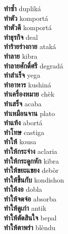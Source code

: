 \textbf{ ทำซ้ำ  } dupliká \\
\textbf{ ทำตัว  } komportá \\
\textbf{ ทำตัวดี  } komportá \\
\textbf{ ทำธุรกิจ  } deal \\
\textbf{ ทำร้ายร่างกาย  } ataká \\
\textbf{ ทำลาย  } kibra \\
\textbf{ ทำลายศักดิ์ศรี  } degradá \\
\textbf{ ทำสำเร็จ  } yega \\
\textbf{ ทำอาหาร  } kushiná \\
\textbf{ ทำเครื่องหมาย  } chèk \\
\textbf{ ทำเสร็จ  } acaba \\
\textbf{ ทำเหมือนจาน  } plato \\
\textbf{ ทำแท้ง  } abortá \\
\textbf{ ทำโทษ  } castiga \\
\textbf{ ทำให้  } kousa \\
\textbf{ ทำให้กระจ่าง  } aclaria \\
\textbf{ ทำให้กระดูกหัก  } kibra \\
\textbf{ ทำให้ขยะแขยง  } debòr \\
\textbf{ ทำให้ขึ้นกับ  } kondishon \\
\textbf{ ทำให้งอ  } dobla \\
\textbf{ ทำให้จดจ่อ  } absorba \\
\textbf{ ทำให้ดูเก่า  } antik \\
\textbf{ ทำให้ตัดสินใจ  } bepal \\
\textbf{ ทำให้ตาพร่า  } blèndu \\
